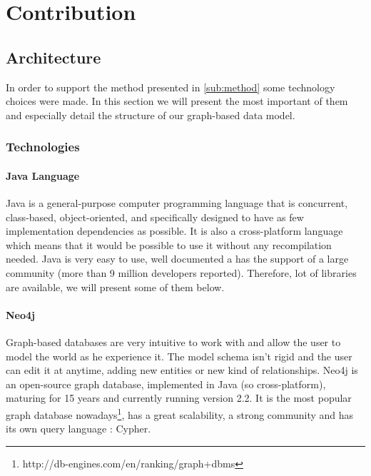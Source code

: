 
\section{Contribution} %
\label{sec:contribution}

\subsection{Architecture} %
\label{sub:architecture}
In order to support the method presented in \ref{sub:method} some technology choices were made. In this section we will present the most important of them and especially detail the structure of our graph-based data model.
\subsubsection{Technologies} %
\label{ssub:technologies}
\paragraph{Java Language} %
\label{par:java_language}
Java is a general-purpose computer programming language that is concurrent, class-based, object-oriented, and specifically designed to have as few implementation dependencies as possible. It is also a cross-platform language which means that it would be possible to use it without any recompilation needed. Java is very easy to use, well documented a has the support of a large community (more than 9 million developers reported). Therefore, lot of libraries are available, we will present some of them below. 
\paragraph{Neo4j} %
\label{par:neo4j}
Graph-based databases are very intuitive to work with and allow the user to model the world as he experience it. The model schema isn't rigid and the user can edit it at anytime, adding new entities or new kind of relationships. Neo4j is an open-source graph database, implemented in Java (so cross-platform), maturing for 15 years and currently running version 2.2. It is the most popular graph database nowadays\footnote{http://db-engines.com/en/ranking/graph+dbms}, has a great scalability, a strong community and has its own query language : Cypher. 
